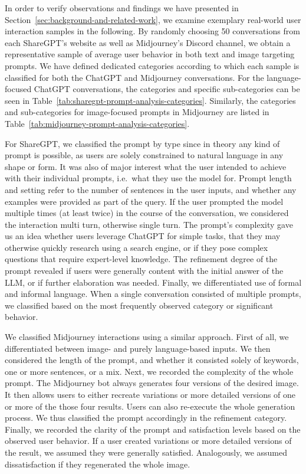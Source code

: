 In order to verify observations and findings we have presented in Section~\ref{sec:background-and-related-work},
we examine exemplary real-world user interaction samples in the following.
By randomly choosing 50 conversations from each ShareGPT's website as well as Midjourney's Discord
channel, we obtain a representative sample of average user behavior in both text and image targeting prompts.
We have defined dedicated categories according to which each sample is classified for both
the ChatGPT and Midjourney conversations.
For the language-focused ChatGPT conversations, the categories and specific sub-categories can be
seen in Table~\ref{tab:sharegpt-prompt-analysis-categories}.
Similarly, the categories and sub-categories for image-focused prompts in Midjourney are listed
in Table~\ref{tab:midjourney-prompt-analysis-categories}.

For ShareGPT, we classified the prompt by type since in theory any kind of prompt is possible,
as users are solely constrained to natural language in any shape or form.
It was also of major interest what the user intended to achieve with their individual prompts,
i.e.\ what they use the model for.
Prompt length and setting refer to the number of sentences in the user inputs, and whether
any examples were provided as part of the query.
If the user prompted the model multiple times (at least twice) in the course of the conversation, we considered the interaction multi turn, otherwise single turn.
The prompt's complexity gave us an idea whether users leverage ChatGPT for simple
tasks, that they may otherwise quickly research using a search engine, or if they pose complex
questions that require expert-level knowledge.
The refinement degree of the prompt revealed if users were generally content with the initial
answer of the LLM, or if further elaboration was needed.
Finally, we differentiated use of formal and informal language.
When a single conversation consisted of multiple prompts, we classified based on the most
frequently observed category or significant behavior.

We classified Midjourney interactions using a similar approach.
First of all, we differentiated between image- and purely language-based inputs.
We then considered the length of the prompt, and whether it consisted solely of keywords, one
or more sentences, or a mix.
Next, we recorded the complexity of the whole prompt.
The Midjourney bot always generates four versions of the desired image.
It then allows users to either recreate variations or more detailed versions of one or more of
the those four results.
Users can also re-execute the whole generation process.
We thus classified the prompt accordingly in the refinement category.
Finally, we recorded the clarity of the prompt and satisfaction levels based
on the observed user behavior.
If a user created variations or more detailed versions of the result, we assumed they were
generally satisfied.
Analogously, we assumed dissatisfaction if they regenerated the whole image.

